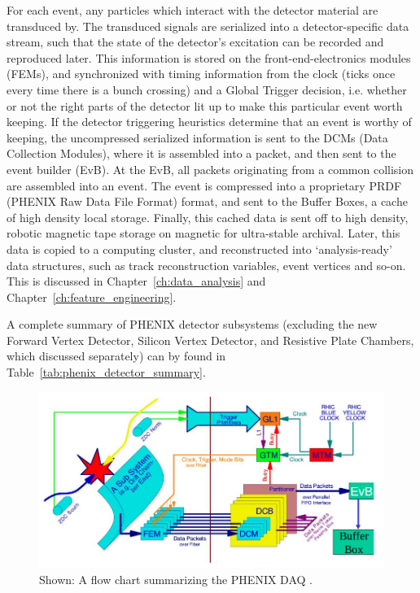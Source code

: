 For each event, any particles which interact with the detector material are
transduced by. The transduced signals are serialized into a detector-specific
data stream, such that the state of the detector's excitation can be recorded
and reproduced later. This information is stored on the front-end-electronics
modules (FEMs), and synchronized with timing information from the clock (ticks
once every time there is a bunch crossing) and a Global Trigger decision, i.e.
whether or not the right parts of the detector lit up to make this particular
event worth keeping. If the detector triggering heuristics determine that an
event is worthy of keeping, the uncompressed serialized information is sent to
the DCMs (Data Collection Modules), where it is assembled into a packet, and
then sent to the event builder (EvB). At the EvB, all packets originating from a
common collision are assembled into an event.  The event is compressed into a
proprietary PRDF (PHENIX Raw Data File Format) format, and sent to the Buffer
Boxes, a cache of high density local storage. Finally, this cached data is sent
off to high density, robotic magnetic tape storage on magnetic for ultra-stable
archival. Later, this data is copied to a computing cluster, and reconstructed
into `analysis-ready' data structures, such as track reconstruction variables,
event vertices and so-on. This is discussed in Chapter~\ref{ch:data_analysis}
and Chapter~\ref{ch:feature_engineering}.

A complete summary of PHENIX detector subsystems (excluding the new Forward
Vertex Detector, Silicon Vertex Detector, and Resistive Plate Chambers, which
discussed separately) can by found in Table~\ref{tab:phenix_detector_summary}.

\begin{figure}
  \includegraphics[width=\linewidth]{./figures/daq_overview}
  \caption{ 
    Shown: A flow chart summarizing the PHENIX DAQ \cite{Desmond2016}. 
  }
  \label{fig:phenix_daq_overview}
\end{figure}

